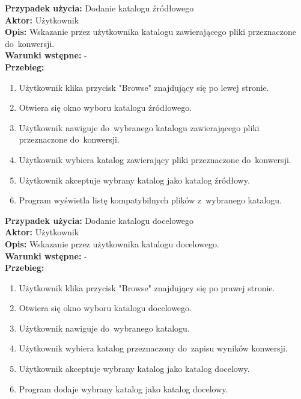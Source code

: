 \noindent \textbf{Przypadek użycia:} Dodanie katalogu źródłowego\\
\textbf{Aktor:} Użytkownik\\
\textbf{Opis:} Wskazanie przez użytkownika katalogu zawierającego pliki przeznaczone do~konwersji.\\
\textbf{Warunki wstępne:} -\\
\textbf{Przebieg:}
\begin{enumerate}
	\item Użytkownik klika przycisk "Browse" znajdujący się po lewej stronie.
	\item Otwiera się okno wyboru katalogu źródłowego.
	\item Użytkownik nawiguje do~wybranego katalogu zawierającego pliki przeznaczone do~konwersji.
	\item Użytkownik wybiera katalog zawierający pliki przeznaczone do~konwersji.
	\item Użytkownik akceptuje wybrany katalog jako katalog źródłowy.
	\item Program wyświetla listę kompatybilnych plików z~wybranego katalogu.
\end{enumerate}

\newpage

\noindent \textbf{Przypadek użycia:} Dodanie katalogu docelowego\\
\textbf{Aktor:} Użytkownik\\
\textbf{Opis:} Wskazanie przez użytkownika katalogu docelowego.\\
\textbf{Warunki wstępne:} -\\
\textbf{Przebieg:}
\begin{enumerate}
	\item Użytkownik klika przycisk "Browse" znajdujący się po prawej stronie.
	\item Otwiera się okno wyboru katalogu docelowego.
	\item Użytkownik nawiguje do~wybranego katalogu.
	\item Użytkownik wybiera katalog przeznaczony do~zapisu wyników konwersji.
	\item Użytkownik akceptuje wybrany katalog jako katalog docelowy.
	\item Program dodaje wybrany katalog jako katalog docelowy.
\end{enumerate}


